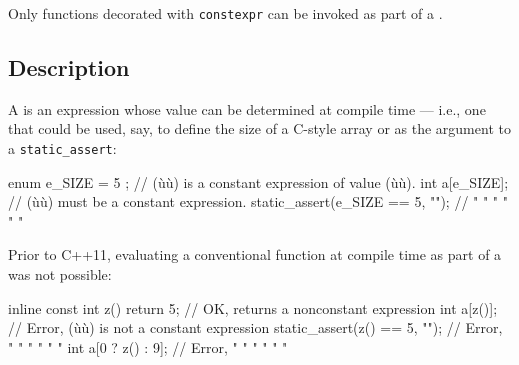 
\label{compile-time-invocable-functions}
\setcounter{table}{0}
\setcounter{footnote}{0}
\setcounter{lstlisting}{0}



Only functions decorated with \lstinline!constexpr! can be invoked as part
of a .

\subsection[Description]{Description}\label{description}

A  is an expression whose value can be
determined at compile time --- i.e., one that could be used, say, to
define the size of a C-style array or as the argument to a
\lstinline!static_assert!:

\begin{emcppslisting}
enum { e_SIZE = 5 };             // (ù{}ù) is a constant expression of value (ù{}ù).
int a[e_SIZE];                   // (ù{}ù) must be a constant expression.
static_assert(e_SIZE == 5, "");  //    "     "   " "     "          "
\end{emcppslisting}

\noindent Prior to C++11, evaluating a conventional function at compile time as
part of a  was not possible:

\begin{emcppslisting}
inline const int z() { return 5; }  // OK, returns a nonconstant expression
int a[z()];                         // Error, (ù{}ù) is not a constant expression
static_assert(z() == 5, "");        // Error,  "     "  "  "      "         "
int a[0 ? z() : 9];                 // Error,  "     "  "  "      "         "
\end{emcppslisting}

